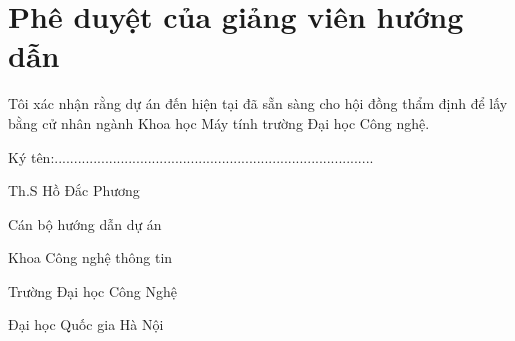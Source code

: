 \chapter*{Phê duyệt của giảng viên hướng dẫn}

Tôi xác nhận rằng dự án đến hiện tại đã sẵn sàng cho hội đồng thẩm định để lấy bằng cử nhân ngành Khoa học Máy tính trường Đại học Công nghệ.

\begin{flushright}
Ký tên:..................................................................................

Th.S Hồ Đắc Phương

Cán bộ hướng dẫn dự án

Khoa Công nghệ thông tin

Trường Đại học Công Nghệ

Đại học Quốc gia Hà Nội
\end{flushright}
